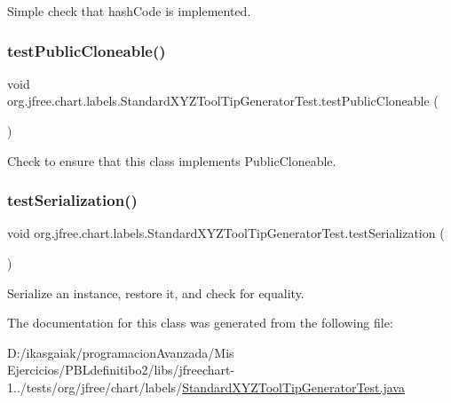 Simple check that hash\+Code is implemented. \mbox{\label{classorg_1_1jfree_1_1chart_1_1labels_1_1_standard_x_y_z_tool_tip_generator_test_a23d101f60aeca4d2a110f83c26e761a4}} 
\subsubsection{\texorpdfstring{test\+Public\+Cloneable()}{testPublicCloneable()}}
{\footnotesize\ttfamily void org.\+jfree.\+chart.\+labels.\+Standard\+X\+Y\+Z\+Tool\+Tip\+Generator\+Test.\+test\+Public\+Cloneable (\begin{DoxyParamCaption}{ }\end{DoxyParamCaption})}

Check to ensure that this class implements Public\+Cloneable. \mbox{\label{classorg_1_1jfree_1_1chart_1_1labels_1_1_standard_x_y_z_tool_tip_generator_test_a966195f0a1a91390dabc4cfd5b8adb1d}} 
\subsubsection{\texorpdfstring{test\+Serialization()}{testSerialization()}}
{\footnotesize\ttfamily void org.\+jfree.\+chart.\+labels.\+Standard\+X\+Y\+Z\+Tool\+Tip\+Generator\+Test.\+test\+Serialization (\begin{DoxyParamCaption}{ }\end{DoxyParamCaption})}

Serialize an instance, restore it, and check for equality. 

The documentation for this class was generated from the following file\+:\begin{DoxyCompactItemize}
\item 
D\+:/ikasgaiak/programacion\+Avanzada/\+Mis Ejercicios/\+P\+B\+Ldefinitibo2/libs/jfreechart-\/1../tests/org/jfree/chart/labels/\mbox{\hyperlink{_standard_x_y_z_tool_tip_generator_test_8java}{Standard\+X\+Y\+Z\+Tool\+Tip\+Generator\+Test.\+java}}\end{DoxyCompactItemize}
